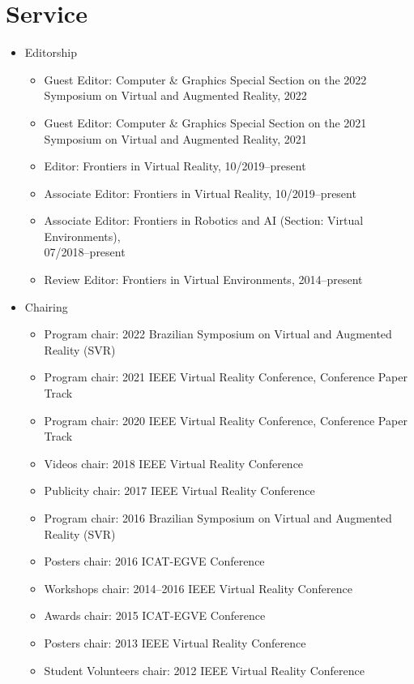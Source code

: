 \documentclass[wideaddress]{vitae}
\let\olditem\item
\def\item{\nopagebreak[4]\olditem}%
\begin{document}
\section{Service}
\begin{itemize}
	\item{Editorship}
		\begin{itemize}
			\item{Guest Editor: Computer \& Graphics Special Section on the 2022 Symposium on Virtual and Augmented Reality, 2022}
                \item{Guest Editor: Computer \& Graphics Special Section on the 2021 Symposium on Virtual and Augmented Reality, 2021}
			\item{Editor: Frontiers in Virtual Reality, 10/2019--present}
			\item{Associate Editor: Frontiers in Virtual Reality, 10/2019--present}
			\item{Associate Editor: Frontiers in Robotics and AI (Section: Virtual Environments),\\07/2018--present}
			\item{Review Editor: Frontiers in Virtual Environments, 2014--present}
		\end{itemize}
	\item{Chairing}
		\begin{itemize}
			\item{Program chair: 2022 Brazilian Symposium on Virtual and Augmented Reality (SVR)}
			\item{Program chair: 2021 IEEE Virtual Reality Conference, Conference Paper Track}
			\item{Program chair: 2020 IEEE Virtual Reality Conference, Conference Paper Track}
			\item{Videos chair: 2018 IEEE Virtual Reality Conference}
			\item{Publicity chair: 2017 IEEE Virtual Reality Conference}
			\item{Program chair: 2016 Brazilian Symposium on Virtual and Augmented Reality (SVR)}
			\item{Posters chair: 2016 ICAT-EGVE Conference}
			\item{Workshops chair: 2014--2016 IEEE Virtual Reality Conference}
			\item{Awards chair: 2015 ICAT-EGVE Conference}
			\item{Posters chair: 2013 IEEE Virtual Reality Conference}
			\item{Student Volunteers chair: 2012 IEEE Virtual Reality Conference}

\end{itemize}
\end{itemize}
\end{document}
